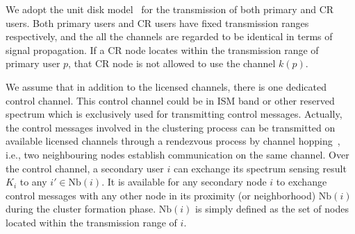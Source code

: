 \documentclass[10pt,journal,compsoc]{IEEEtran}
\theoremstyle{mytheoremstyle}
\theoremstyle{mytheoremstyle}
\theoremstyle{mytheoremstyle}
\begin{document}
We adopt the unit disk model~\cite{unitDiskModel} for the transmission of both primary and CR users.
Both primary users and CR users have fixed transmission ranges respectively, and the all the channels are regarded to be identical in terms of signal propagation.
If a CR node locates within the transmission range of primary user $p$, that CR node is not allowed to use the channel $k(p)$.

We assume that in addition to the licensed channels, there is one dedicated control channel.
This control channel could be in ISM band or other reserved spectrum which is exclusively used for transmitting control messages.
Actually, the control messages involved in the clustering process can be transmitted on available licensed channels through a rendezvous process by channel hopping~\cite{channelHopping_Rendezvous_2014, Gu_distributed_rendezvous_2014}, i.e., two neighbouring nodes establish communication on the same channel.
Over the control channel, a secondary user $i$ can exchange its spectrum sensing result $K_i$ to any $i' \in \text{Nb}(i)$.
It is available for any secondary node $i$ to exchange control messages with any other node in its proximity (or neighborhood) $\text{Nb}(i)$ during the cluster formation phase.
$\text{Nb}(i)$ is simply defined as the set of nodes located within the transmission range of $i$. 





\end{document}
